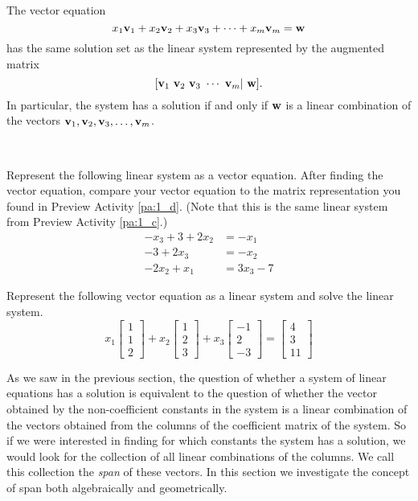 \begin{theorem}
The vector equation
\[x_1 \mathbf{v}_1 + x_2\mathbf{v}_2 + x_3\mathbf{v}_3 + \cdots + x_m\mathbf{v}_m = \mathbf{w}\]
has the same solution set as the linear system represented by the augmented matrix
\[[\vv_1 \  \vv_2 \  \vv_3 \ \cdots \ \vv_m | \ \vw].\]
In particular, the system has a solution if and only if $\mathbf{w}$ is a linear combination of the vectors $\mathbf{v}_1, \mathbf{v}_2, \mathbf{v}_3, \ldots, \mathbf{v}_m$.
\end{theorem}

\begin{activity} \label{act:A1.3_8} ~
	\ba
	\item Represent the following linear system as a vector equation. After finding the vector equation, compare your vector equation to the matrix representation you found in Preview Activity \ref{pa:1_d}. (Note that this is the same linear system from Preview Activity \ref{pa:1_c}.) 
\begin{equation*}
\begin{split}
-x_3 + 3 + 2x_2&= -x_1   \\
-3 + 2x_3 &= -x_2  \\
-2x_2 + x_1 &= 3x_3-7 
\end{split} 
\end{equation*} 


	\item Represent the following vector equation as a linear system and solve the linear system.
\[x_1 \left[ \begin{array}{c} 1 \\ 1 \\ 2 \end{array} \right] +x_2 \left[ \begin{array}{c} 1 \\ 2\\ 3 \end{array} \right] + x_3 \left[ \begin{array}{r} -1 \\ 2 \\ -3 \end{array} \right] = \left[ \begin{array}{c} 4 \\ 3\\ 11 \end{array} \right] \]

	\ea
\end{activity}



As we saw in the previous section, the question of whether a system of linear equations has a solution is equivalent to the question of whether the vector obtained by the non-coefficient constants in the system is a linear combination of the vectors obtained from the columns of the coefficient matrix of the system. So if we were interested in finding for which constants the system has a solution, we would look for the collection of all linear combinations of the columns. We call this collection the \emph{span} of these vectors. In this section we investigate the concept of span both algebraically and geometrically.

